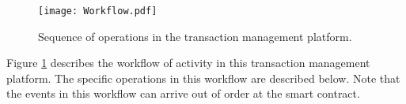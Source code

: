 \label{sec:workflow}

\begin{figure}
    \centering
    \texttt{[image: Workflow.pdf]}
    \caption{Sequence of operations in the transaction management platform.} %
    \label{fig:workflow}
\end{figure}


Figure \ref{fig:workflow} describes the workflow of activity in this transaction management platform.  The specific operations in this workflow are described below. Note that the events in this workflow can arrive out of order at the smart contract. %

